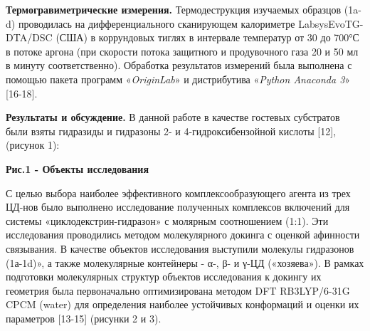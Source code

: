 \begin{multicols}{2}
{\bfseries Термогравиметрические измерения.} Термодеструкция изучаемых
образцов (1a-d) проводилась на дифференциального сканирующем калориметре
LabsysEvoTG-DTA/DSC (США) в коррундовых тиглях в интервале температур от
30 до 700°С в потоке аргона (при скорости потока защитного и
продувочного газа 20 и 50 мл в минуту соответственно). Обработка
результатов измерений была выполнена с помощью пакета программ
«\emph{OriginLab}» и дистрибутива «\emph{Python Anaconda 3}»
{[}16-18{]}.

{\bfseries Результаты и обсуждение.} В данной работе в качестве гостевых
субстратов были взяты гидразиды и гидразоны 2- и 4-гидроксибензойной
кислоты {[}12{]}, (рисунок 1):
\end{multicols}


{\bfseries Рис.1 - Объекты исследования}

\begin{multicols}{2}
С целью выбора наиболее эффективного комплексообразующего агента из трех
ЦД-нов было выполнено исследование полученных комплексов включений для
системы «циклодекстрин-гидразон» с молярным соотношением (1:1). Эти
исследования проводились методом молекулярного докинга с оценкой
афинности связывания. В качестве объектов исследования выступили
молекулы гидразонов (1а-1d)», а также молекулярные контейнеры -
α-, β- и γ-ЦД («хозяева»). В рамках подготовки молекулярных структур
объектов исследования к докингу их геометрия была первоначально
оптимизирована методом DFT RB3LYP/6-31G CPCM (water) для определения
наиболее устойчивых конформаций и оценки их параметров {[}13-15{]}
(рисунки 2 и 3).
\end{multicols}

